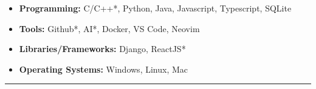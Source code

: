 \documentclass[a4paper,10pt]{article}
\begin{document}
\begin{itemize}[label=$\bullet$, leftmargin=1.2em, itemsep=2pt, topsep=0pt]
    \item \textbf{Programming:} C/C++*, Python, Java, Javascript, Typescript, SQLite
    \item \textbf{Tools:} Github*, AI*, Docker, VS Code, Neovim
    \item \textbf{Libraries/Frameworks:} Django, ReactJS*
    \item \textbf{Operating Systems:} Windows, Linux, Mac
\end{itemize}

\vspace{4pt}
\hrule
\end{document}
